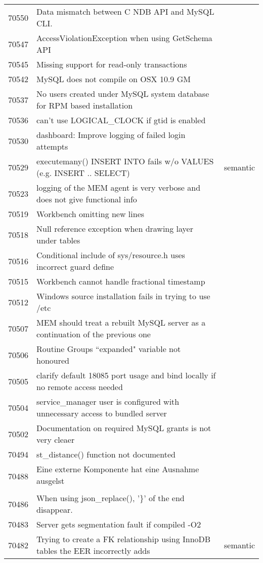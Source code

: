 \begin{longtable}[c]{p{1cm}p{10cm}p{1cm}}
70550 & Data mismatch between C NDB API and MySQL CLI. &  \\
70547 & AccessViolationException when using GetSchema API &  \\
70545 & Missing support for read-only transactions &  \\
70542 & MySQL does not compile on OSX 10.9 GM &  \\
70537 & No users created under MySQL system database for RPM based installation &  \\
70536 & can't use LOGICAL\_CLOCK if gtid is enabled &  \\
70530 & dashboard: Improve logging of failed login attempts &  \\
70529 & executemany() INSERT INTO fails w/o VALUES (e.g. INSERT .. SELECT) & semantic \\
70523 & logging of the MEM agent is very verbose and does not give functional info &  \\
70519 & Workbench omitting new lines &  \\
70518 & Null reference exception when drawing layer under tables &  \\
70516 & Conditional include of sys/resource.h uses incorrect guard define &  \\
70515 & Workbench cannot handle fractional timestamp &  \\
70512 & Windows source installation fails in trying to use /etc &  \\
70507 & MEM should treat a rebuilt MySQL server as a continuation of the previous one &  \\
70506 & Routine Groups ``expanded" variable not honoured &  \\
70505 & clarify default 18085 port usage and bind locally if no remote access needed &  \\
70504 & service\_manager user is configured with unnecessary access to bundled server &  \\
70502 & Documentation on required MySQL grants is not very cleaer &  \\
70494 & st\_distance() function not documented &  \\
70488 & Eine externe Komponente hat eine Ausnahme ausgelst &  \\
70486 & When using json\_replace(), '\}' of the end disappear. &  \\
70483 & Server gets segmentation fault if compiled -O2 &  \\
70482 & Trying to create a FK relationship using InnoDB tables the EER incorrectly adds & semantic \\

\end{longtable}

